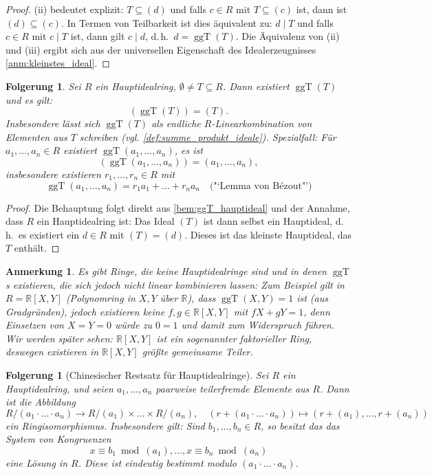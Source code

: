 \documentclass[a4paper, twoside, 11pt, ngerman]{report}
\newcommand{\RR}{\mathds R}
\DeclareMathOperator{\ggT}{ggT}
\theoremstyle{definistyle}
\newtheorem{anm}[satz]{Anmerkung}
\newtheorem{folgerung}[satz]{Folgerung}
\theoremstyle{remark}
\begin{document}
\begin{proof}
(ii) bedeutet explizit: $T \subseteq (d)$ und falls $c \in R$ mit $T \subseteq (c)$ ist, dann ist $(d) \subseteq (c)$. In Termen von Teilbarkeit ist dies äquivalent zu: $d \mid T$ und falls $c \in R$ mit $c \mid T$ ist, dann gilt $c \mid d$, d.\,h.\ $d = \ggT(T)$. Die Äquivalenz von (ii) und (iii) ergibt sich aus der universellen Eigenschaft des Idealerzeugnisses \ref{anm:kleinstes_ideal}.
\end{proof}

\begin{folgerung}\label{folg:ggT_hauptideal}
Sei $R$ ein Hauptidealring, $\emptyset \neq T \subseteq R$. Dann existiert $\ggT(T)$ und es gilt:
\[
(\ggT(T)) = (T).
\]
Insbesondere lässt sich $\ggT(T)$ als endliche $R$-Linearkombination von Elementen aus $T$ schreiben (vgl. \ref{def:summe_produkt_ideale}). Spezialfall: Für $a_1, \dots, a_n \in R$ existiert $\ggT(a_1, \dots, a_n)$, es ist \[(\ggT(a_1, \dots, a_n)) = (a_1, \dots, a_n),\] insbesondere existieren $r_1, \dots, r_n \in R$ mit 
\[
\ggT(a_1, \dots, a_n) = r_1 a_1 + \dots + r_n a_n \quad \text{("`Lemma von B\'ezout"')}
\]
\end{folgerung}

\begin{proof}
Die Behauptung folgt direkt aus \ref{bem:ggT_hauptideal} und der Annahme, dass $R$ ein Hauptidealring ist: Das Ideal $(T)$ ist dann selbst ein Hauptideal, d.\,h.\ es existiert ein $d \in R$ mit $(T) = (d)$. Dieses ist das kleinste Hauptideal, das $T$ enthält.
\end{proof}

\begin{anm}\label{anm:ggT_nicht_linear}
Es gibt Ringe, die keine Hauptidealringe sind und in denen $\ggT$s existieren, die sich jedoch nicht linear kombinieren lassen: Zum Beispiel gilt in $R = \RR[X, Y]$ (Polynomring in $X, Y$ über $\RR$), dass $\ggT(X, Y) = 1$ ist (aus Gradgründen), jedoch existieren keine $f, g \in \RR[X, Y]$ mit $f X + g Y = 1$, denn Einsetzen von $X = Y = 0$ würde zu $0 = 1$ und damit zum Widerspruch führen. Wir werden später sehen: $\RR[X, Y]$ ist ein sogenannter faktorieller Ring, deswegen existieren in $\RR[X, Y]$ größte gemeinsame Teiler.
\end{anm}

\begin{folgerung}[Chinesischer Restsatz für Hauptidealringe]
Sei $R$ ein Hauptidealring, und seien $a_1,\ldots,a_n$ paarweise teilerfremde Elemente aus $R$.
Dann ist die Abbildung
\[
R/(a_1\cdot\ldots\cdot a_n)\to R/(a_1)\times\ldots\times R/(a_n), \quad
(r+(a_1\cdot\ldots\cdot a_n))\mapsto(r+(a_1),\ldots,r+(a_n))
\]
ein Ringisomorphismus. Insbesondere gilt: Sind $b_1,\ldots,b_n\in R$, so besitzt das das System von Kongruenzen
\[
x\equiv b_1 \bmod (a_1), \ldots, x\equiv b_n \bmod (a_n)
\]
eine Lösung in $R$. Diese ist eindeutig bestimmt modulo $(a_1\cdot\ldots\cdot a_n)$.
\end{folgerung}
\end{document}
